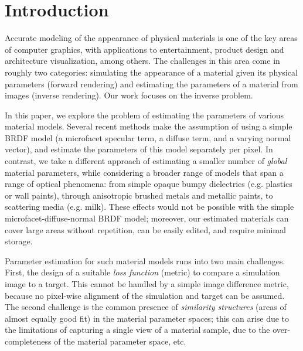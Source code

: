 \section{Introduction}

Accurate modeling of the appearance of physical materials is one of the key areas of computer graphics, with applications to entertainment, product design and architecture visualization, among others. The challenges in this area come in roughly two categories: simulating the appearance of a material given its physical parameters (forward rendering) and estimating the parameters of a material from images (inverse rendering). Our work focuses on the inverse problem.

In this paper, we explore the problem of estimating the parameters of various material models. Several recent methods make the assumption of using a simple BRDF model (a microfacet specular term, a diffuse term, and a varying normal vector), and estimate the parameters of this model separately per pixel. In contrast, we take a different approach of estimating a smaller number of \emph{global} material parameters, while considering a broader range of models that span a range of optical phenomena: from simple opaque bumpy dielectrics (e.g. plastics or wall paints), through anisotropic brushed metals and metallic paints, to scattering media (e.g. milk). These effects would not be possible with the simple microfacet-diffuse-normal BRDF model; moreover, our estimated materials can cover large areas without repetition, can be easily edited, and require minimal storage.

Parameter estimation for such material models runs into two main challenges. First, the design of a suitable \emph{loss function} (metric) to compare a simulation image to a target. This cannot be handled by a simple image difference metric, because no pixel-wise alignment of the simulation and target can be assumed. The second challenge is the common presence of \emph{similarity structures} (areas of almost equally good fit) in the material parameter spaces; this can arise due to the limitations of capturing a single view of a material sample, due to the over-completeness of the material parameter space, etc.

